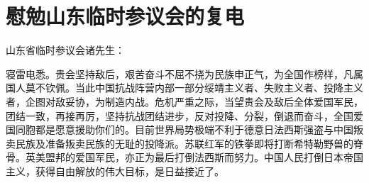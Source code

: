 \section[慰勉山东临时参议会的复电（一九四二年九月）]{慰勉山东临时参议会的复电}


山东省临时参议会诸先生：

寝雷电悉。贵会坚持敌后，艰苦奋斗不屈不挠为民族申正气，为全国作榜样，凡属国人莫不钦佩。当此中国抗战阵营内部一部分绥靖主义者、失败主义者、投降主义者，企图对敌妥协，为制造内战。危机严重之际，当望贵会及敌后全体爱国军民，团结一致，再接再厉，坚持抗战团结进步，反对投降、分裂，倒退而奋斗，全国爱国同胞都是愿意援助你们的。目前世界局势极端不利于德意日法西斯强盗与中国叛卖民族及准备叛卖民族的无耻的投降派。苏联红军的铁拳即将打断希特勒野兽的脊骨。英美盟邦的爱国军民，亦正为最后打倒法西斯而努力。中国人民打倒日本帝国主义，获得自由解放的伟大目标，是日益接近了。


